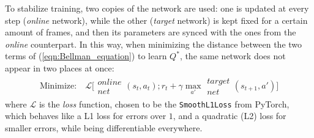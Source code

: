 \documentclass[11pt,a4paper]{scrartcl}
\begin{document}
\medskip

To stabilize training, two copies of the network are used: one is updated at every step (\textit{online} network), while the other (\textit{target} network) is kept fixed for a certain amount of frames, and then its parameters are synced with the ones from the \textit{online} counterpart. In this way, when minimizing the distance between the two terms of (\ref{eqn:Bellman_equation}) to learn $Q^*$, the same network does not appear in two places at once:
\begin{align}\label{eqn:loss_goal}
    \text{Minimize:} \quad \mathcal{L}\big[\substack{\textit{online}\\\textit{net}}(s_t, a_t); r_t + \gamma \max_{a'} \substack{\textit{target}\\\textit{net}} (s_{t+1}, a')\big]
\end{align}
where $\mathcal{L}$ is the \textit{loss} function, chosen to be the \texttt{SmoothL1Loss} from PyTorch, which behaves like a L1 loss for errors over $1$, and a quadratic (L2) loss for smaller errors, while being differentiable everywhere.

\medskip
\end{document}
